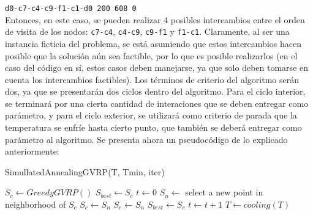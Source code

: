 \documentclass[letter, 10pt]{article}
\begin{document}
\texttt{d0-c7-c4-c9-f1-c1-d0 200   608   0}\\

Entonces, en este caso, se pueden realizar 4 posibles intercambios entre el orden de visita de los nodos: \texttt{c7-c4}, \texttt{c4-c9}, \texttt{c9-f1} y \texttt{f1-c1}. Claramente, al ser una instancia ficticia del problema, se está asumiendo que estos intercambios hacen posible que la solución aún sea factible, por lo que es posible realizarlos (en el caso del código en sí, estos casos deben manejarse, ya que solo deben tomarse en cuenta los intercambios factibles). Los términos de criterio del algoritmo serán dos, ya que se presentarán dos ciclos dentro del algoritmo. Para el ciclo interior, se terminará por una cierta cantidad de interaciones que se deben entregar como parámetro, y para el ciclo exterior, se utilizará como criterio de parada que la temperatura se enfríe hasta cierto punto, que también se deberá entregar como parámetro al algoritmo. Se presenta ahora un pseudocódigo de lo explicado anteriormente:

\begin{algorithm}
\caption{SimullatedAnnealingGVRP(T, Tmin, iter)}\label{alg:cap}
    \begin{algorithmic}
        \State $S_c \gets GreedyGVRP()$
        \State $S_{best} \gets S_c$
            \State $t \gets 0$
                \State $S_{n} \gets $ select a new point in neighborhood of $S_c$
                    \State $S_{c} \gets S_n$
                    \State $S_{c} \gets S_n$
                \EndIf
                    \State $S_{best} \gets S_c$
                \EndIf
            \State $t \gets t + 1$
            \EndWhile
        \State $T \gets cooling(T)$
        \EndWhile
    \end{algorithmic}
\end{algorithm}
\end{document}
